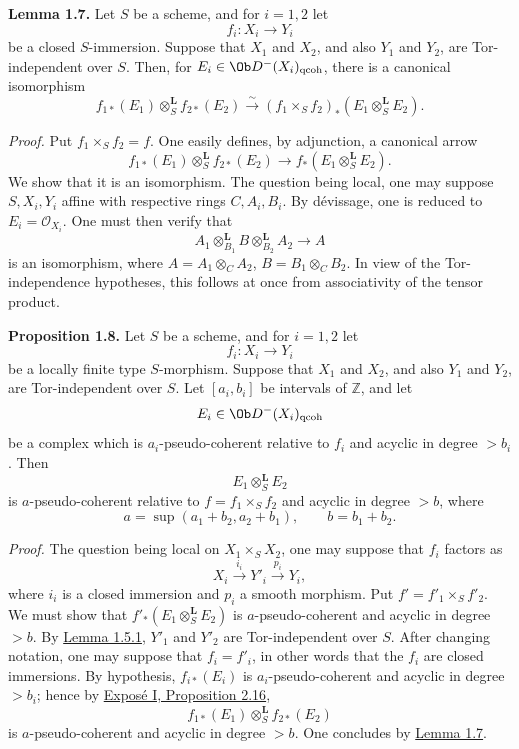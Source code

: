 \textbf{Lemma 1.7.} Let \(S\) be a scheme, and for \(i=1,2\) let
\[
  f_i:X_i\longrightarrow Y_i
\]
be a closed \(S\)-immersion. Suppose that \(X_1\) and \(X_2\), and also \(Y_1\) and \(Y_2\), are Tor-independent over \(S\). Then, for \(E_i\in \Ob D^{-}(X_i)_{\mathrm{qcoh}}\), there is a canonical isomorphism
\[
  f_{1*}(E_1)\otimes_S^{\mathbf L} f_{2*}(E_2)
  \xrightarrow{\sim}
  (f_1\times_S f_2)_*(E_1\otimes_S^{\mathbf L}E_2).
\]

\emph{Proof.} Put \(f_1\times_Sf_2=f\). One easily defines, by adjunction, a canonical arrow
\[
  f_{1*}(E_1)\otimes_S^{\mathbf L} f_{2*}(E_2)
  \longrightarrow
  f_*(E_1\otimes_S^{\mathbf L}E_2).
\]
We show that it is an isomorphism. The question being local, one may suppose \(S,X_i,Y_i\) affine with respective rings \(C,A_i,B_i\). By dévissage, one is reduced to \(E_i=\mathcal O_{X_i}\). One must then verify that
\[
  A_1\otimes^{\mathbf L}_{B_1}B\otimes^{\mathbf L}_{B_2}A_2
  \longrightarrow A
\]
is an isomorphism, where \(A=A_1\otimes_C A_2\), \(B=B_1\otimes_C B_2\). In view of the Tor-independence hypotheses, this follows at once from associativity of the tensor product.

\textbf{Proposition 1.8.} Let \(S\) be a scheme, and for \(i=1,2\) let
\[
  f_i:X_i\longrightarrow Y_i
\]
be a locally finite type \(S\)-morphism. Suppose that \(X_1\) and \(X_2\), and also \(Y_1\) and \(Y_2\), are Tor-independent over \(S\). Let \([a_i,b_i]\) be intervals of \(\mathbb Z\), and let
\[
  E_i\in \Ob D^{-}(X_i)_{\mathrm{qcoh}}
\]
be a complex which is \(a_i\)-pseudo-coherent relative to \(f_i\) and acyclic in degree \(>b_i\). Then
\[
  E_1\otimes_S^{\mathbf L}E_2
\]
is \(a\)-pseudo-coherent relative to \(f=f_1\times_S f_2\) and acyclic in degree \(>b\), where
\[
  a=\sup(a_1+b_2,a_2+b_1),\qquad b=b_1+b_2.
\]

\emph{Proof.} The question being local on \(X_1\times_SX_2\), one may suppose that \(f_i\) factors as
\[
  X_i\xrightarrow{i_i}Y'_i\xrightarrow{p_i}Y_i,
\]
where \(i_i\) is a closed immersion and \(p_i\) a smooth morphism. Put \(f'=f'_1\times_Sf'_2\). We must show that \(f'_*(E_1\otimes_S^{\mathbf L}E_2)\) is \(a\)-pseudo-coherent and acyclic in degree \(>b\). By \hyperlink{sga6.e03.lem.1-5-1}{Lemma 1.5.1}, \(Y'_1\) and \(Y'_2\) are Tor-independent over \(S\). After changing notation, one may suppose that \(f_i=f'_i\), in other words that the \(f_i\) are closed immersions. By hypothesis, \(f_{i*}(E_i)\) is \(a_i\)-pseudo-coherent and acyclic in degree \(>b_i\); hence by \hyperlink{sga6.e01.cor.2-16}{Exposé I, Proposition 2.16},
\[
  f_{1*}(E_1)\otimes_S^{\mathbf L}f_{2*}(E_2)
\]
is \(a\)-pseudo-coherent and acyclic in degree \(>b\). One concludes by \hyperlink{sga6.e03.lem.1-7}{Lemma 1.7}.

